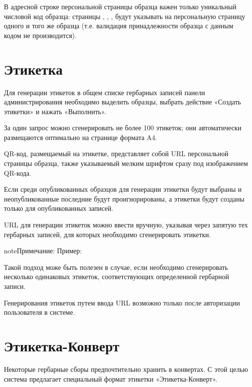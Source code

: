 \documentclass[letterpaper,10pt,russian]{sphinxmanual}
\begin{document}
В адресной строке персональной страницы образца важен только
уникальный числовой код образца: страницы ,
, ,
будут указывать на персональную страницу одного и того же образца
(т.е. валидация принадлежности образца с данным кодом не производится).

\ignorespaces 

\section{Этикетка}
\label{\detokenize{main:index-37}}\label{\detokenize{main:id40}}
Для генерации этикеток в общем списке гербарных записей панели
администрирования необходимо
выделить образцы, выбрать действие \textendash{} «Создать этикетки» и нажать «Выполнить».

За один запрос можно сгенерировать не более 100 этикеток;
они автоматически размещаются оптимально на странице формата A4.

QR-код, размещаемый на этикетке, представляет собой URL персональной
страницы образца, также указываемый мелким шрифтом сразу под изображением QR-кода.

Если среди опубликованных образцов для генерации этикетки будут
выбраны и неопубликованные \textendash{} последние будут проигнорированы,
а этикетки будут созданы только для опубликованных записей.

URL для генерации этикеток можно ввести вручную, указывая через
запятую  тех гербарных записей, для которых необходимо
сгенерировать этикетки.

\begin{sphinxadmonition}{note}{Примечание:}
Пример:
\end{sphinxadmonition}

Такой подход може быть полезен в случае, если необходимо сгенерировать
несколько одинаковых этикеток, соответствующих определенной гербарной записи.

Генерирования этикеток путем ввода URL
возможно только после авторизации пользователя в системе.


\ignorespaces 

\section{Этикетка-Конверт}
\label{\detokenize{main:id41}}\label{\detokenize{main:index-38}}
Некоторые гербарные сборы предпочтительно хранить в конвертах.
С этой целью система предлагает специальный формат
этикетки «Этикетка-Конверт».
\end{document}
